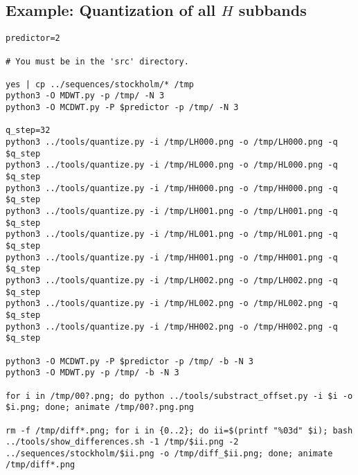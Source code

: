 \subsection*{Example: Quantization of all $H$ subbands}
\begin{verbatim}
predictor=2

# You must be in the 'src' directory.

yes | cp ../sequences/stockholm/* /tmp
python3 -O MDWT.py -p /tmp/ -N 3
python3 -O MCDWT.py -P $predictor -p /tmp/ -N 3

q_step=32
python3 ../tools/quantize.py -i /tmp/LH000.png -o /tmp/LH000.png -q $q_step
python3 ../tools/quantize.py -i /tmp/HL000.png -o /tmp/HL000.png -q $q_step
python3 ../tools/quantize.py -i /tmp/HH000.png -o /tmp/HH000.png -q $q_step
python3 ../tools/quantize.py -i /tmp/LH001.png -o /tmp/LH001.png -q $q_step
python3 ../tools/quantize.py -i /tmp/HL001.png -o /tmp/HL001.png -q $q_step
python3 ../tools/quantize.py -i /tmp/HH001.png -o /tmp/HH001.png -q $q_step
python3 ../tools/quantize.py -i /tmp/LH002.png -o /tmp/LH002.png -q $q_step
python3 ../tools/quantize.py -i /tmp/HL002.png -o /tmp/HL002.png -q $q_step
python3 ../tools/quantize.py -i /tmp/HH002.png -o /tmp/HH002.png -q $q_step

python3 -O MCDWT.py -P $predictor -p /tmp/ -b -N 3
python3 -O MDWT.py -p /tmp/ -b -N 3

for i in /tmp/00?.png; do python ../tools/substract_offset.py -i $i -o $i.png; done; animate /tmp/00?.png.png

rm -f /tmp/diff*.png; for i in {0..2}; do ii=$(printf "%03d" $i); bash ../tools/show_differences.sh -1 /tmp/$ii.png -2 ../sequences/stockholm/$ii.png -o /tmp/diff_$ii.png; done; animate /tmp/diff*.png
\end{verbatim}


